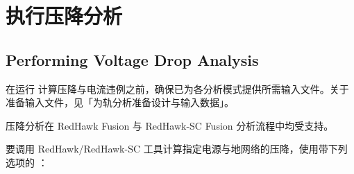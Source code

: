 \section{执行压降分析}
\subsection*{Performing Voltage Drop Analysis}

\begin{noteBox}
在运行  计算压降与电流违例之前，确保已为各分析模式提供所需输入文件。关于准备输入文件，见「为轨分析准备设计与输入数据」。

压降分析在 RedHawk Fusion 与 RedHawk-SC Fusion 分析流程中均受支持。
\end{noteBox}

要调用 RedHawk/RedHawk-SC 工具计算指定电源与地网络的压降，使用带下列选项的 ：

